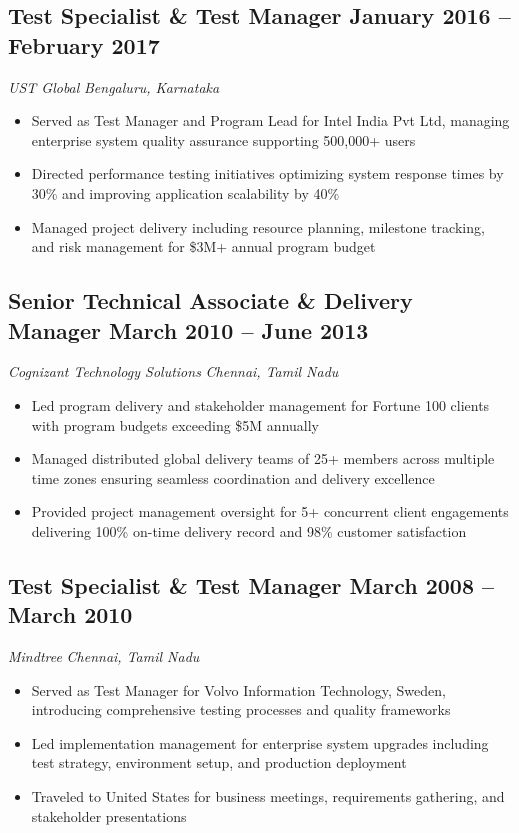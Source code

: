 \documentclass[11pt,a4paper]{article}
\begin{document}
\subsection*{Test Specialist \& Test Manager \hfill \normalfont January 2016 -- February 2017}
\textit{UST Global} \hfill \textit{Bengaluru, Karnataka}
\begin{itemize}[leftmargin=*, itemsep=2pt]
    \item Served as Test Manager and Program Lead for Intel India Pvt Ltd, managing enterprise system quality assurance supporting 500,000+ users
    \item Directed performance testing initiatives optimizing system response times by 30\% and improving application scalability by 40\%
    \item Managed project delivery including resource planning, milestone tracking, and risk management for \$3M+ annual program budget
\end{itemize}

\subsection*{Senior Technical Associate \& Delivery Manager \hfill \normalfont March 2010 -- June 2013}
\textit{Cognizant Technology Solutions} \hfill \textit{Chennai, Tamil Nadu}
\begin{itemize}[leftmargin=*, itemsep=2pt]
    \item Led program delivery and stakeholder management for Fortune 100 clients with program budgets exceeding \$5M annually
    \item Managed distributed global delivery teams of 25+ members across multiple time zones ensuring seamless coordination and delivery excellence
    \item Provided project management oversight for 5+ concurrent client engagements delivering 100\% on-time delivery record and 98\% customer satisfaction
\end{itemize}

\subsection*{Test Specialist \& Test Manager \hfill \normalfont March 2008 -- March 2010}
\textit{Mindtree} \hfill \textit{Chennai, Tamil Nadu}
\begin{itemize}[leftmargin=*, itemsep=2pt]
    \item Served as Test Manager for Volvo Information Technology, Sweden, introducing comprehensive testing processes and quality frameworks
    \item Led implementation management for enterprise system upgrades including test strategy, environment setup, and production deployment
    \item Traveled to United States for business meetings, requirements gathering, and stakeholder presentations
\end{itemize}
\end{document}
